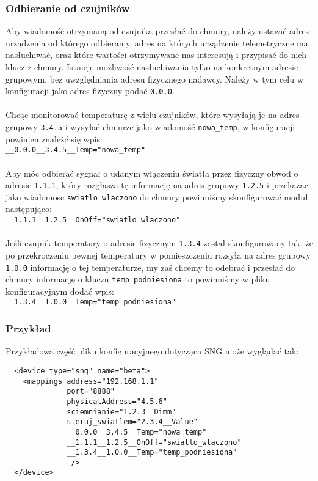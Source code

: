 \documentclass[11pt]{article}
\begin{document}
\subsubsection{Odbieranie od czujników}
Aby wiadomość otrzymaną od czujnika przesłać do chmury, należy ustawić adres urządzenia od którego odbieramy,
adres na których urządzenie telemetryczne ma nasłuchiwać, oraz które wartości otrzymywane nas interesują i 
przypisać do nich klucz z chmury. Istnieje możliwość nasłuchiwania tylko na konkretnym adresie grupowym,
bez uwzględniania adresu fizycznego nadawcy. Należy w tym celu w konfiguracji jako adres fizyczny
podać \verb|0.0.0|.\\
\\
Chcąc monitorować temperaturę z wielu czujników, które wysyłają je na adres grupowy \verb|3.4.5| i wysyłać chmurze
jako wiadomość \verb|nowa_temp|, w konfiguracji powinien znaleźć się wpis:\\
\verb|__0.0.0__3.4.5__Temp="nowa_temp"|\\
\\
Aby móc odbierać sygnał o udanym włączeniu światła przez fizyczny obwód o adresie \verb|1.1.1|,
który rozgłasza tę informację na adres grupowy \verb|1.2.5| i przekazac jako wiadomosc 
\verb|swiatlo_wlaczono| do chmury powinniśmy skonfigurować moduł następująco:\\
\verb|__1.1.1__1.2.5__OnOff="swiatlo_wlaczono"|\\
\\
Jeśli czujnik temperatury o adresie fizycznym \verb|1.3.4| został skonfigurowany tak, że po przekroczeniu
pewnej temperatury w pomieszczeniu rozsyła na adres grupowy \verb|1.0.0| informację o tej temperaturze,
my zaś chcemy to odebrać i przesłać do chmury informację o kluczu \verb|temp_podniesiona| to powinniśmy w
pliku konfiguracyjnym dodać wpis:\\
\verb|__1.3.4__1.0.0__Temp="temp_podniesiona"|  

\subsubsection{Przykład}
Przykładowa część pliku konfiguracyjnego dotycząca SNG może wyglądać tak:
\begin{verbatim}
  <device type="sng" name="beta">
    <mappings address="192.168.1.1"
              port="8888"
              physicalAddress="4.5.6"
              sciemnianie="1.2.3__Dimm"
              steruj_swiatlem="2.3.4__Value"
              __0.0.0__3.4.5__Temp="nowa_temp"
              __1.1.1__1.2.5__OnOff="swiatlo_wlaczono"
              __1.3.4__1.0.0__Temp="temp_podniesiona"
               />
  </device>
\end{verbatim}
\end{document}
